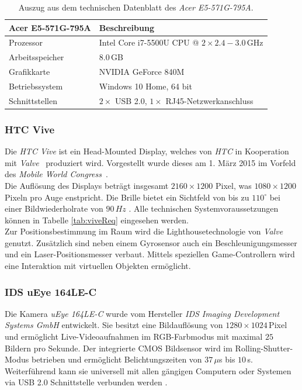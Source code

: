 \begin{table}
	\centering
	\begin{tabular}{|l|l|}
		\hline
		\Absatzbox{}
		\textbf{Acer E5-571G-795A}& \textbf{Beschreibung} \\
		\hline
		Prozessor & Intel Core i7-5500U CPU @ $2\times 2.4-3.0\,$GHz\\
		\hline
		Arbeitsspeicher & $8.0\,$GB \\
		\hline 
		Grafikkarte & NVIDIA GeForce 840M\\
		\hline
		Betriebssystem & Windows 10 Home, 64 bit \\
		\hline
		Schnittstellen & $2\times$ USB 2.0, $1\times$ RJ45-Netzwerkanschluss\\
		\hline
	\end{tabular}
	\caption{Auszug aus dem technischen Datenblatt des \textit{Acer E5-571G-795A}.}
	\label{tab:TrackingCompParam}
\end{table}


\subsubsection{HTC Vive}\label{sec:Vive} 
Die \textit{HTC Vive} ist ein Head-Mounted Display, welches von \textit{HTC} in Kooperation mit \textit{Valve}~\cite{website:Valve} produziert wird. Vorgestellt wurde dieses am 1. März 2015 im Vorfeld des \textit{Mobile World Congress}~\cite{website:mobileworldcongress}.\\
Die Auflösung des Displays beträgt insgesamt $2160\times1200$ Pixel, was $1080\times1200$ Pixeln pro Auge enstpricht. Die Brille bietet ein Sichtfeld von bis zu $110^\circ$ bei einer Bildwiederholrate von $90\,Hz$ \cite{website:HTC_Vive}. Alle technischen Systemvoraussetzungen können in Tabelle \ref{tab:viveReq} eingesehen werden. \\
Zur Positionsbestimmung im Raum wird die Lighthousetechnologie von \textit{Valve} genutzt. Zusätzlich sind neben einem Gyrosensor auch ein Beschleunigungsmesser und ein Laser-Positionsmesser verbaut. Mittels speziellen Game-Controllern wird eine Interaktion mit virtuellen Objekten ermöglicht.

\subsubsection{IDS uEye 164LE-C}\label{sec:uEye} 
Die Kamera \textit{uEye 164LE-C} wurde vom Hersteller \textit{IDS Imaging Development Systems GmbH} entwickelt. Sie besitzt eine Bildauflösung von $1280\times1024$\,Pixel und ermöglicht Live-Videoaufnahmen im RGB-Farbmodus mit maximal $25$ Bildern pro Sekunde. Der integrierte CMOS Bildsensor wird im Rolling-Shutter-Modus betrieben und ermöglicht Belichtungszeiten von $37\,\mu$s bis $10$\,s. Weiterführend kann sie universell mit allen gängigen Computern oder Systemen via USB 2.0 Schnittstelle verbunden werden \cite{website:UEyeTechSpec}.

